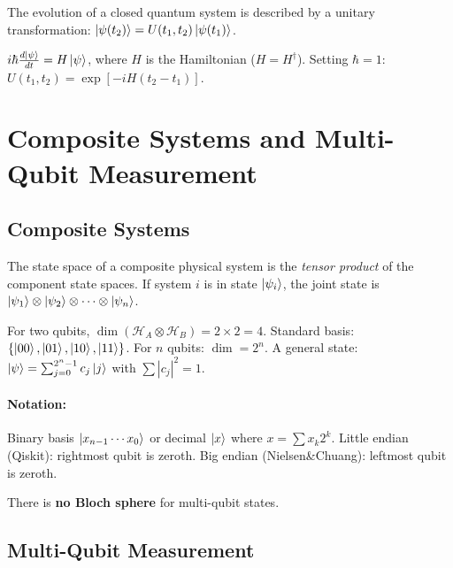 \documentclass[10pt,a4paper]{article}
\begin{document}
\begin{tcolorbox}[propstyle, title={Postulate}]
The evolution of a closed quantum system is described by a unitary transformation: $\ket{\psi(t_2)}=U(t_1,t_2)\ket{\psi(t_1)}$.
\end{tcolorbox}

\begin{tcolorbox}[propstyle, title={Schr\"odinger Equation}]
$i\hbar\frac{d\ket{\psi}}{dt}=H\ket{\psi}$, where $H$ is the Hamiltonian ($H=H^\dagger$). Setting $\hbar=1$: $U(t_1,t_2)=\exp[-iH(t_2-t_1)]$.
\end{tcolorbox}
\section{Composite Systems and Multi-Qubit Measurement}

\subsection{Composite Systems}

\begin{tcolorbox}[propstyle, title={Postulate}]
The state space of a composite physical system is the \emph{tensor product} of the component state spaces. If system $i$ is in state $\ket{\psi_i}$, the joint state is $\ket{\psi_1}\otimes\ket{\psi_2}\otimes\cdots\otimes\ket{\psi_n}$.
\end{tcolorbox}

For two qubits, $\dim(\mathcal{H}_A\otimes\mathcal{H}_B)=2\times 2=4$. Standard basis: $\{\ket{00},\ket{01},\ket{10},\ket{11}\}$. For $n$ qubits: $\dim=2^n$. A general state: $\ket{\psi}=\sum_{j=0}^{2^n-1}c_j\ket{j}$ with $\sum|c_j|^2=1$.

\paragraph{Notation:} Binary basis $\ket{x_{n-1}\cdots x_0}$ or decimal $\ket{x}$ where $x=\sum x_k 2^k$. Little endian (Qiskit): rightmost qubit is zeroth. Big endian (Nielsen\&Chuang): leftmost qubit is zeroth.

There is \textbf{no Bloch sphere} for multi-qubit states.

\subsection{Multi-Qubit Measurement}
\end{document}
